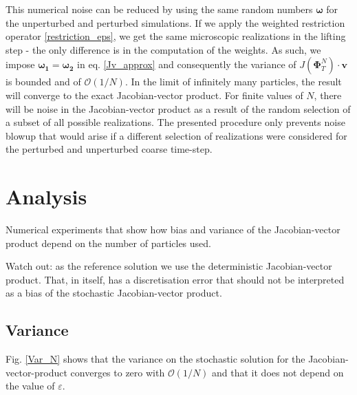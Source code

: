 \documentclass[]{article}
\newcommand{\cts}{\ensuremath{\boldsymbol{\Phi}^N_T}} %
\theoremstyle{definition}
\begin{document}
This numerical noise can be reduced by using the same random numbers $\boldsymbol{\omega}$ for the unperturbed and perturbed simulations. If we apply the weighted restriction operator \eqref{restriction_eps},  we get the same microscopic realizations in the lifting step - the only difference is in the computation of the weights. As such,  we impose $\boldsymbol{\omega_1} = \boldsymbol{\omega_2}$ in eq. \eqref{Jv_approx} and consequently the variance of $J(\cts) \cdot \mathbf{v}$ is bounded and of  $\mathcal{O}(1/ N)$.  In the limit of infinitely many particles, the result will converge to the exact Jacobian-vector product. For finite values of $N$, there will be noise in the Jacobian-vector product as a result of the random selection of a subset of all possible realizations. The presented procedure only prevents noise blowup that would arise if a different selection of realizations were considered for the perturbed and unperturbed coarse time-step.




\section{Analysis}

Numerical experiments that show how bias and variance of the Jacobian-vector product depend on the number of particles used.

Watch out: as the reference solution we use the deterministic Jacobian-vector product. That, in itself, has a discretisation error that should not be interpreted as a bias of the stochastic Jacobian-vector product.




\subsection{Variance}

Fig. \ref{Var_N} shows that the variance on the stochastic solution for the Jacobian-vector-product converges to zero with $\mathcal{O}(1/ N)$ and that it does not depend on the value of $\varepsilon$.
\end{document}
